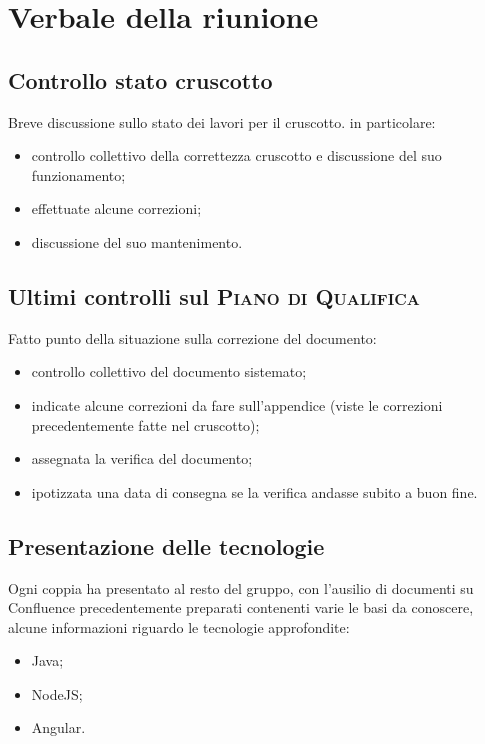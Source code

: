 \section{Verbale della riunione}

\subsection{Controllo stato cruscotto}
Breve discussione sullo stato dei lavori per il cruscotto. in particolare:
    \begin{itemize}
        \item controllo collettivo della correttezza cruscotto e discussione del suo funzionamento;
        \item effettuate alcune correzioni;
        \item discussione del suo mantenimento.
    \end{itemize}

\subsection{Ultimi controlli sul \textsc{Piano di Qualifica}}
Fatto punto della situazione sulla correzione del documento:
    \begin{itemize}
   		\item controllo collettivo del documento sistemato;
   		\item indicate alcune correzioni da fare sull'appendice (viste le correzioni precedentemente fatte nel cruscotto);
		\item assegnata la verifica del documento;
		\item ipotizzata una data di consegna se la verifica andasse subito a buon fine.
	\end{itemize}
	
\subsection{Presentazione delle tecnologie}
Ogni coppia ha presentato al resto del gruppo, con l'ausilio di documenti su Confluence precedentemente preparati contenenti varie le basi da conoscere, alcune informazioni riguardo le tecnologie approfondite:
    \begin{itemize}
   		\item Java;
   		\item NodeJS;
		\item Angular.
	\end{itemize}
	
